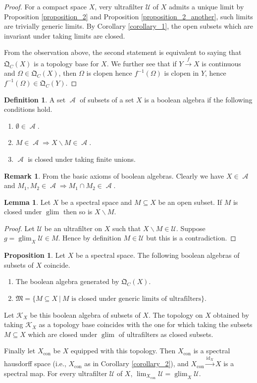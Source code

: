 \documentclass[10pt]{article}
\numberwithin{equation}{section}
\theoremstyle{definition}
\newtheorem{proposition}{Proposition}[subsection]
\newtheorem{definition}{Definition}[subsection]
\newtheorem{lemma}{Lemma}[subsection]
\newtheorem{remark}{Remark}[subsection]
\DeclareMathOperator{\id}{id}
\DeclareMathOperator{\Alg}{\mathcal{A}}
\DeclareMathOperator{\glim}{glim}
\DeclareMathOperator{\con}{con}
\newcommand{\U}[0]{\mathcal{U}}
\newcommand{\sep}[0]{\:|\:}
\newcommand{\QC}[0]{\mathfrak{Q}_C}
\begin{document}
\begin{proof}
    For a compact space $X$, very ultrafilter $\U$ of $X$ admits a unique limit by Proposition \ref{proposition_2} and Proposition \ref{proposition_2_another}, such limits are trivially generic limits. By Corollary \ref{corollary_1}, the open subsets which are invariant under taking limits are closed.
    \par From the observation above, the second statement is equivalent to saying that $\QC(X)$ is a topology base for $X$.
    We further see that if $Y\stackrel{f}{\to} X$ is continuous and $\Omega\in\QC(X)$, then $\Omega$ is clopen hence $f^{-1}(\Omega)$ is clopen in $Y$, hence $f^{-1}(\Omega)\in \QC(Y)$.
\end{proof}
\begin{definition}
    A set $\Alg$ of subsets of a set $X$ is a boolean algebra if the following conditions hold.
    \begin{enumerate}
        \item $\emptyset\in\Alg$.
        \item $M\in\Alg\Rightarrow X\backslash M\in\Alg$.
        \item $\Alg$ is closed under taking finite unions.
    \end{enumerate}
\end{definition}
\begin{remark}
    From the basic axioms of boolean algebras. Clearly we have $X\in \Alg$ and $M_1,M_2\in\Alg\Rightarrow M_1\cap M_2\in\Alg$.
\end{remark}
\begin{lemma}
    \label{lemma_complement_glim_stability}
    Let $X$ be a spectral space and $M\subseteq X$ be an open subset. If $M$ is closed under $\glim$ then so is $X\backslash M$.
\end{lemma}
\begin{proof}
    Let $\U$ be an ultrafilter on $X$ such that $X\backslash M\in\U$. Suppose $g=\glim_X\U\in M$. Hence by definition $M\in\U$ but this is a contradiction.
\end{proof}
\begin{proposition}
    \label{proposition_5}
    Let $X$ be a spectral space. The following boolean algebras of subsets of $X$ coincide.
    \begin{enumerate}
        \item The boolean algebra generated by $\QC(X)$.
        \item $\mathfrak{M} = \{M\subseteq X\sep \text{$M$ is closed under generic limits of ultrafilters}\}$.
    \end{enumerate}
    Let $\mathcal{K}_X$ be this boolean algebra of subsets of $X$. The topology on $X$ obtained by taking $\mathcal{K}_X$ as a topology base coincides with the one for which taking the subsets $M\subseteq X$ which are closed under $\glim$ of ultrafilters as closed subsets.
    \par Finally let $X_{\con}$ be $X$ equipped with this topology. Then $X_{\con}$ is a spectral hausdorff space (i.e., $X_{\con}$ as in Corollary \ref{corollary_2}), and $X_{\con}\stackrel{\id_X}{\to}X$ is a spectral map. For every ultrafilter $\U$ of $X$, $\lim_{X_{\con}}\U=\glim_X\U$.
\end{proposition}
\end{document}
